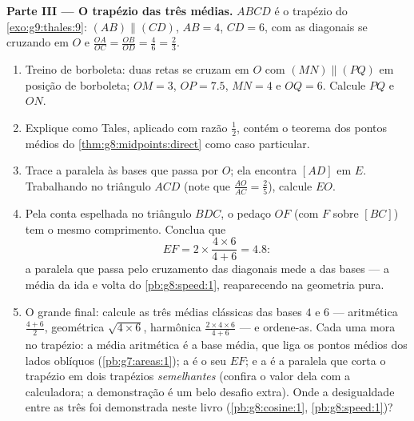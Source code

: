 \begin{problem}
\medskip
\noindent\textbf{Parte III --- O trapézio das três médias.}
$ABCD$ é o trapézio do \cref{exo:g9:thales:9}:
$(AB) \parallel (CD)$, $AB = 4$, $CD = 6$, com as diagonais se cruzando
em $O$ e $\frac{OA}{OC} = \frac{OB}{OD} = \frac{4}{6} = \frac23$.
\begin{enumerate}[resume]
  \item Treino de borboleta: duas retas se cruzam em $O$ com
        $(MN) \parallel (PQ)$ em posição de borboleta; $OM = 3$,
        $OP = 7.5$, $MN = 4$ e $OQ = 6$. Calcule $PQ$ e $ON$.
  \item Explique como Tales, aplicado com razão $\frac12$, contém o
        teorema dos pontos médios do \cref{thm:g8:midpoints:direct}
        como caso particular.
  \item Trace a paralela às bases que passa por $O$; ela encontra
        $[AD]$ em $E$. Trabalhando no triângulo $ACD$ (note que
        $\frac{AO}{AC} = \frac25$), calcule $EO$.
  \item Pela conta espelhada no triângulo $BDC$, o pedaço $OF$ (com $F$
        sobre $[BC]$) tem o mesmo comprimento. Conclua que
        \[
        EF = 2 \times \frac{4 \times 6}{4 + 6} = 4.8 :
        \]
        a paralela que passa pelo cruzamento das diagonais mede a
        \emph{} das bases --- a média da ida e volta do
        \cref{pb:g8:speed:1}, reaparecendo na geometria pura.
  \item O grande final: calcule as três médias clássicas das bases $4$
        e $6$ --- aritmética $\frac{4+6}{2}$, geométrica
        $\sqrt{4 \times 6}$, harmônica
        $\frac{2 \times 4 \times 6}{4 + 6}$ --- e ordene-as. Cada uma
        mora no trapézio: a média aritmética é a base média, que liga
        os pontos médios dos lados oblíquos (\cref{pb:g7:areas:1}); a
         é o seu  $EF$; e a  é a
        paralela que corta o trapézio em dois trapézios
        \emph{semelhantes} (confira o valor dela com a calculadora; a
        demonstração é um belo desafio extra). Onde a desigualdade
        entre as três foi demonstrada neste livro
        (\cref{pb:g8:cosine:1}, \cref{pb:g8:speed:1})?
\end{enumerate}
\end{problem}
